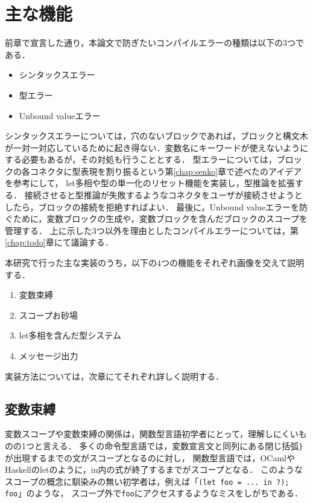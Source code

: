 \chapter{主な機能}\label{chap:features}

前章で宣言した通り，本論文で防ぎたいコンパイルエラーの種類は以下の3つである．
\begin {itemize}
  \item シンタックスエラー
  \item 型エラー
  \item Unbound valueエラー
\end {itemize}

シンタックスエラーについては，穴のないブロックであれば，ブロックと構文木が一対一対応しているために起き得ない．変数名にキーワードが使えないようにする必要もあるが，その対処も行うこととする．
型エラーについては，ブロックの各コネクタに型表現を割り振るという第\ref{chap:senko}章で述べた\cite{Typed-Blockly}のアイデアを参考にして，
let多相や型の単一化のリセット機能を実装し，型推論を拡張する．
接続させると型推論が失敗するようなコネクタをユーザが接続させようとしたら，ブロックの接続を拒絶すればよい．
最後に，Unbound valueエラーを防ぐために，変数ブロックの生成や，変数ブロックを含んだブロックのスコープを管理する．
上に示した3つ以外を理由としたコンパイルエラーについては，第\ref{chap:todo}章にて議論する．

本研究で行った主な実装のうち，以下の4つの機能をそれぞれ画像を交えて説明する．
\begin {enumerate}
  \item 変数束縛
  \item スコープお砂場
  \item let多相を含んだ型システム
  \item メッセージ出力
\end {enumerate}
実装方法については，次章にてそれぞれ詳しく説明する．

\section {変数束縛}
変数スコープや変数束縛の関係は，関数型言語初学者にとって，理解しにくいものの1つと言える．
多くの命令型言語では，変数宣言文と同列にある閉じ括弧{\tt \}}が出現するまでの文がスコープとなるのに対し，
関数型言語では，OCamlやHaskellのletのように，in内の式が終了するまでがスコープとなる．
このようなスコープの概念に馴染みの無い初学者は，例えば「{\tt (let foo = ...\ in ?); foo}」のような，
スコープ外で{\tt foo}にアクセスするようなミスをしがちである．

